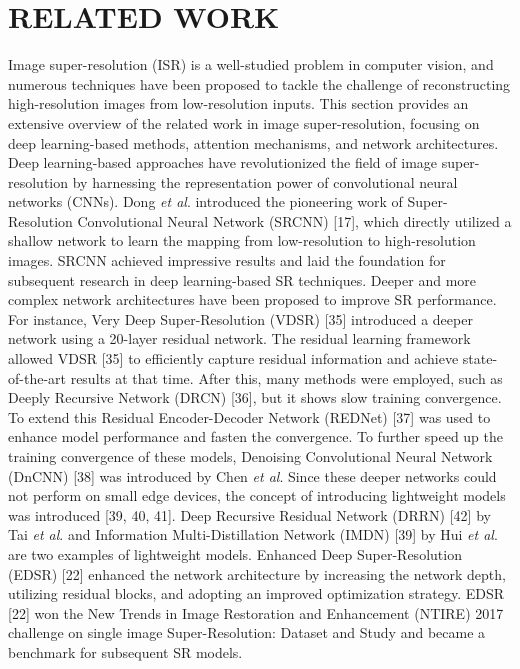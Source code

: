\documentclass{ieeeaccess}
\begin{document}
\section{RELATED WORK}
Image super-resolution (ISR) is a well-studied problem in computer vision, and numerous techniques have been proposed to tackle the challenge of reconstructing high-resolution images from low-resolution inputs. This section provides an extensive overview of the related work in image super-resolution, focusing on deep learning-based methods, attention mechanisms, and network architectures.
Deep learning-based approaches have revolutionized the field of image super-resolution by harnessing the representation power of convolutional neural networks (CNNs). Dong \textit{et al}. introduced the pioneering work of Super-Resolution Convolutional Neural Network (SRCNN) [17], which directly utilized a shallow network to learn the mapping from low-resolution to high-resolution images. SRCNN achieved impressive results and laid the foundation for subsequent research in deep learning-based SR techniques.
Deeper and more complex network architectures have been proposed to improve SR performance. For instance, Very Deep Super-Resolution (VDSR) [35] introduced a deeper network using a 20-layer residual network. The residual learning framework allowed VDSR [35] to efficiently capture residual information and achieve state-of-the-art results at that time. After this, many methods were employed, such as Deeply Recursive Network (DRCN) [36], but it shows slow training convergence. To extend this Residual Encoder-Decoder Network (REDNet) [37] was used to enhance model performance and fasten the convergence. To further speed up the training convergence of these models, Denoising Convolutional Neural Network (DnCNN) [38] was introduced by Chen \textit{et al}. Since these deeper networks could not perform on small edge devices, the concept of introducing lightweight models was introduced [39, 40, 41]. Deep Recursive Residual Network (DRRN) [42] by Tai \textit{et al}. and Information Multi-Distillation Network (IMDN) [39] by Hui \textit{et al}. are two examples of lightweight models.
Enhanced Deep Super-Resolution (EDSR) [22] enhanced the network architecture by increasing the network depth, utilizing residual blocks, and adopting an improved optimization strategy. EDSR [22] won the New Trends in Image Restoration and Enhancement (NTIRE) 2017 challenge on single image Super-Resolution: Dataset and Study and became a benchmark for subsequent SR models. 
\end{document}
